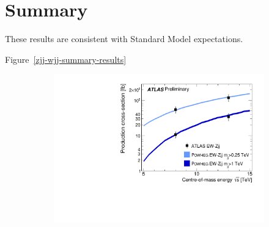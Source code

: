 \documentclass{PoS}
\begin{document}
\section{Summary}

These results are consistent with Standard Model expectations.

Figure~\ref{zjj-wjj-summary-results}

\begin{figure}
  \centering
  \begin{subfigure}[t]{0.57\textwidth}
    \includegraphics[width=.99\textwidth]{STDM-2016-09/fig_06.pdf}
    \caption{}
  \end{subfigure}%
  ~
  \begin{subfigure}[t]{0.42\textwidth}

\end{subfigure}
\end{figure}
\end{document}
